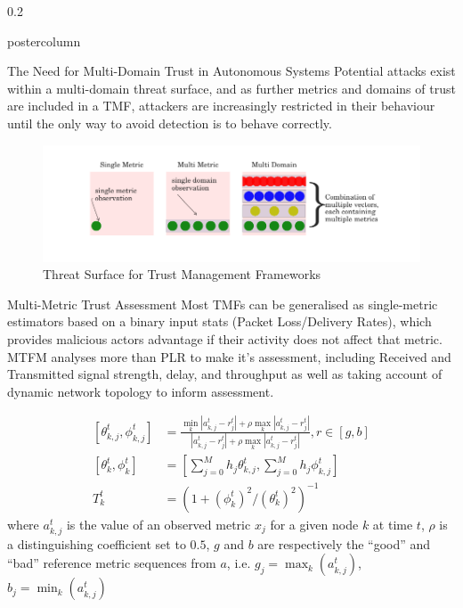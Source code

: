 \documentclass[final,hyperref={pdfpagelabels=false}]{beamer}
\def\colwidth{0.2\linewidth}
\begin{document}
\begin{frame}[fragile]
\begin{columns}[T]
\begin{column}{\colwidth}
\begin{beamercolorbox}[center,wd=\textwidth]{postercolumn}
\begin{minipage}[T]{.98\textwidth}
{\begin{block}{The Need for Multi-Domain Trust in Autonomous Systems}
							Potential attacks exist within a multi-domain threat surface, and as further metrics and domains of trust are included in a TMF, attackers are increasingly restricted in their behaviour until the only way to avoid detection is to behave correctly.
							\begin{figure}[h]
								\centering
								\includegraphics[width=0.9\linewidth]{threat_surface_sum}
								\caption{Threat Surface for Trust Management Frameworks}
							\end{figure}
						\end{block}
												
												
						\begin{block}{Multi-Metric Trust Assessment}
							Most TMFs can be generalised as single-metric estimators based on a binary input stats (Packet Loss/Delivery Rates), which provides malicious actors advantage if their activity does not affect that metric. MTFM\cite{Guo11} analyses more than PLR to make it's assessment, including Received and Transmitted signal strength, delay, and throughput as well as taking account of dynamic network topology to inform assessment.
							
							\begin{align}
								\label{eq:grc}
								[\theta_{k,j}^t,\phi_{k,j}^t] & = \frac{\min_k|a_{k,j}^t - r_j^t| + \rho \max_k|a_{k,j}^t-r_j^t|}{|a_{k,j}^t-r_j^t| + \rho \max_k|a_{k,j}^t-r_j^t|},  r \in [g,b] \\
								\label{eq:metric_weighting}
								[\theta_k^t, \phi_k^t]        & = \left[\sum_{j=0}^M h_j \theta_{k,j}^t,\sum_{j=0}^M h_j \phi_{k,j}^t \right]                                                     \\
								\label{eq:trust_value}
								T_k^t                         & = ({1+{(\phi_k^t)^2}/{(\theta_k^t)^2}})^{-1}                                                                                      
							\end{align}
							where $a_{k,j}^t$ is the value of an observed metric $x_j$ for a given node $k$ at time $t$, $\rho$ is a distinguishing coefficient set to $0.5$, $g$ and $b$ are respectively the ``good'' and ``bad'' reference metric sequences from $a$, i.e. $g_j=\max_k({a_{k,j}^t})$,  $b_j=\min_k({a_{k,j}^t})$ 
							

\end{block}}
\end{minipage}
\end{beamercolorbox}
\end{column}
\end{columns}
\end{frame}
\end{document}
